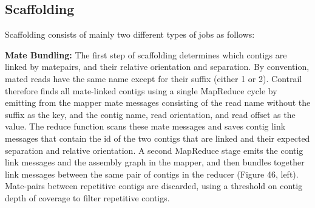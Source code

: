 \documentclass[conference]{IEEEtran}
\begin{document}
\subsection {Scaffolding}
Scaffolding consists of mainly two different types of jobs as follows:

\textbf{Mate Bundling:}
The first step of scaffolding determines which contigs are linked by matepairs, and their relative orientation and separation. By convention, mated reads have the same name except for their suffix (either 1 or 2). Contrail therefore finds all mate-linked contigs using a single MapReduce cycle by emitting from the mapper mate messages consisting of the read name without the suffix as the key, and the contig name, read orientation, and read offset as the value. The reduce function scans these mate messages and saves contig link messages that contain the id of the two contigs that are linked and their expected separation and relative orientation. A second MapReduce stage emits the contig link messages and the assembly graph in the mapper, and then bundles together link messages between the same pair of contigs in the reducer (Figure 46, left). Mate-pairs between repetitive contigs are discarded, using a threshold on contig depth of coverage to filter repetitive contigs.
\end{document}
